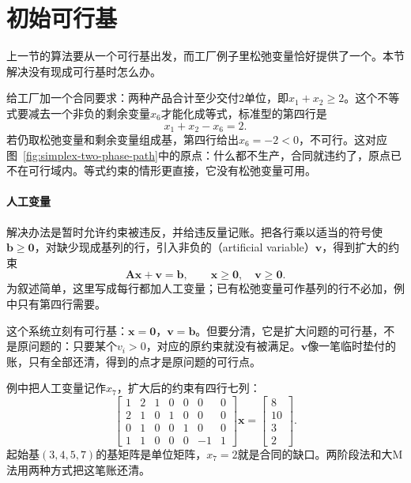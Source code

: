 \section{初始可行基}
\label{sec:simplex-initial-basis}

上一节的算法要从一个可行基出发，而工厂例子里松弛变量恰好提供了一个。本节解决没有现成可行基时怎么办。

给工厂加一个合同要求：两种产品合计至少交付$2$单位，即$x_1+x_2\geq2$。这个不等式要减去一个非负的剩余变量$x_6$才能化成等式，标准型的第四行是
\begin{equation}
 x_1+x_2-x_6=2.
 \label{eq:simplex-order-row}
\end{equation}
若仍取松弛变量和剩余变量组成基，第四行给出$x_6=-2<0$，不可行。这对应图~\ref{fig:simplex-two-phase-path}中的原点：什么都不生产，合同就违约了，原点已不在可行域内。等式约束的情形更直接，它没有松弛变量可用。

\paragraph{人工变量}
解决办法是暂时允许约束被违反，并给违反量记账。把各行乘以适当的符号使$\bm{b}\geq\bm{0}$，对缺少现成基列的行，引入非负的（artificial variable）$\bm{v}$，得到扩大的约束
\begin{equation}
 \bm{A}\bm{x}+\bm{v}=\bm{b},\qquad \bm{x}\geq\bm{0},\quad \bm{v}\geq\bm{0}.
 \label{eq:simplex-artificial-system}
\end{equation}
为叙述简单，这里写成每行都加人工变量；已有松弛变量可作基列的行不必加，例中只有第四行需要。

这个系统立刻有可行基：$\bm{x}=\bm{0}$，$\bm{v}=\bm{b}$。但要分清，它是扩大问题的可行基，不是原问题的：只要某个$v_i>0$，对应的原约束就没有被满足。$\bm{v}$像一笔临时垫付的账，只有全部还清，得到的点才是原问题的可行点。

例中把人工变量记作$x_7$，扩大后的约束有四行七列：
\[
 \begin{bmatrix}
 1&2&1&0&0&0&0\\
 2&1&0&1&0&0&0\\
 0&1&0&0&1&0&0\\
 1&1&0&0&0&-1&1
 \end{bmatrix}\bm{x}
 =\begin{bmatrix}8\\10\\3\\2\end{bmatrix}.
\]
起始基$(3,4,5,7)$的基矩阵是单位矩阵，$x_7=2$就是合同的缺口。两阶段法和大M法用两种方式把这笔账还清。

